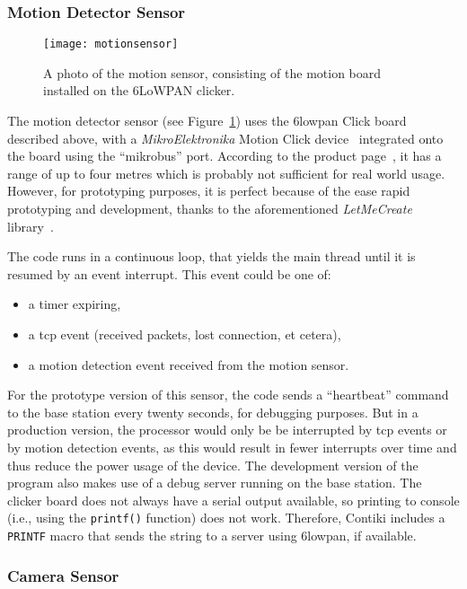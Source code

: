 \subsubsection{Motion Detector Sensor}
\begin{figure}
  \centering
  \texttt{[image: motionsensor]}
  \caption{A photo of the motion sensor, consisting of the motion board
  installed on the 6LoWPAN clicker.}
  \label{fig:motionsensor}
\end{figure}
The motion detector sensor (see Figure~\ref{fig:motionsensor}) uses the
\gls{6lowpan} Click board described above, with a \textit{MikroElektronika}
Motion Click device~\cite{motionclick} integrated onto the board using the
``\gls{mikrobus}'' port. According to the product page~\cite{motionclick}, it
has a range of up to four metres which is probably not sufficient for real
world usage. However, for prototyping purposes, it is perfect because of the
ease rapid prototyping and development, thanks to the aforementioned
\textit{LetMeCreate} library~\cite{letmecreate}.

The code runs in a continuous loop, that yields the main thread until it is
resumed by an event interrupt. This event could be one of:

\begin{itemize}
  \item a timer expiring,
  \item a \acrshort{tcp} event (received packets, lost connection, et cetera),
  \item a motion detection event received from the motion sensor.
\end{itemize}

For the prototype version of this sensor, the code sends a ``heartbeat''
command to the base station every twenty seconds, for debugging purposes. But
in a production version, the processor would only be be interrupted by
\acrshort{tcp} events or by motion detection events, as this would result in
fewer interrupts over time and thus reduce the power usage of the device. The
development version of the program also makes use of a debug server running
on the base station. The clicker board does not always have a serial
output available, so printing to console (i.e., using the \texttt{printf()}
function) does not work. Therefore, Contiki includes a \texttt{PRINTF} macro
that sends the string to a server using \gls{6lowpan}, if available.

\subsubsection{Camera Sensor}

